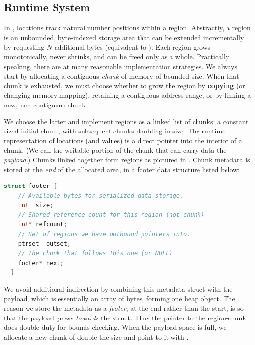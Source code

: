 \subsection{Runtime System}\label{subsec:rts}

In \ourcalc, locations track natural number positions within a region.
Abstractly, a region is an unbounded, byte-indexed storage area that can be
extended incrementally by requesting $N$ additional bytes (equivalent to
).
%
Each region grows monotonically, never shrinks, and can be
freed only as a whole.
%
Practically speaking, there are at many reasonable implementation strategies.
%
We always start by allocating a contiguous {\em chunk} of memory of bounded
size.  When that chunk is exhausted, we must choose whether to grow the
region by {\bf copying} (or changing memory-mapping), retaining a contiguous
address range, or by linking a new, non-contiguous chunk.



We choose the latter and implement regions as a linked list of chunks: a
constant sized initial chunk, with subsequent chunks doubling in size.
%
The runtime representation of locations (and  values)
is a direct pointer into the interior of a chunk.
(We call the writable portion of the chunk that can carry data the {\em payload}.)
Chunks linked together form regions as pictured in
.  Chunk metadata is stored at the \emph{end} of the
allocated area, in a footer data structure listed below:
%
\begin{lstlisting}[language=C++]
  struct footer {
    // Available bytes for serialized-data storage.
    int  size;
    // Shared reference count for this region (not chunk)
    int* refcount;
    // Set of regions we have outbound pointers into.
    ptrset  outset;
    // The chunk that follows this one (or NULL)
    footer* next;
  }
\end{lstlisting}
We avoid additional indirection by combining this metadata struct with the
payload, which is essentially an array of bytes, forming one heap object.
The reason we store the metadata as a \emph{footer}, at the end rather than the
start, is so that the payload grows \emph{towards} the struct.  Thus the pointer
to the region-chunk does double duty for bounds checking.  When the payload
space is full, we allocate a new chunk of double the size and point to it with
.

